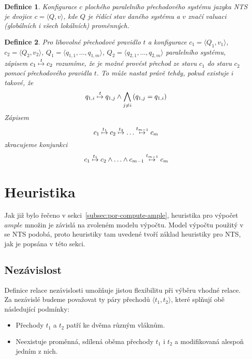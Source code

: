 \documentclass[12pt]{fithesis2}
\newtheorem{definition}{Definice}
\newcommand{\tuple}[1]{\langle #1 \rangle}
\begin{document}
\begin{definition}
\textit{Konfigurace} $c$ plochého paralelního přechodového systému jazyka NTS je dvojice $c = \tuple{Q, v}$, kde $Q$ je řídící stav daného systému a $v$ značí valuaci (globálních i všech lokálních) proměnných.
\end{definition}

\begin{definition}
Pro libovolné přechodové pravidlo $t$ a konfigurace $c_1 = \tuple{Q_1, v_1}$, $c_2=\tuple{Q_2, v_2}$, $Q_1 = \tuple{q_{1,1}, \ldots, q_{1, m}}$, $Q_2 = \tuple{q_{2,1}, \ldots, q_{2, m}}$ paralelního systému, zápisem $c_1 \overset{t}{\mapsto} c_2$ rozumíme, že je možné provést přechod ze stavu $c_1$ do stavu $c_2$ pomocí přechodového pravidla $t$. To může nastat právě tehdy, pokud existuje $i$ takové, že
\begin{equation}
q_{1,i} \overset{t}{\mapsto} q_{1,j} \land \bigwedge_{j \neq i}\left({q_{1,j} = q_{1,i}}\right)
\end{equation}
Zápisem
\begin{equation*}
c_1 \overset{t_1}{\mapsto} c_2 \overset{t_2}{\mapsto} \ldots \overset{t_{m-1}}{\mapsto} c_m
\end{equation*}
zkracujeme konjunkci
\begin{equation*}
c_1 \overset{t_1}{\mapsto} c_2 \land \ldots \land c_{m-1} \overset{t_{m-1}}{\mapsto} c_m
\end{equation*}
\end{definition}


\section{Heuristika}
Jak již bylo řečeno v sekci~\ref{subsec:por-compute-ample}, heuristika pro výpočet $\mathit{ample}$ množin je závislá na zvoleném modelu výpočtu. Model výpočtu použitý v \cite{CLARKE} se NTS podobá, proto heuristiky tam uvedené tvoří základ heuristiky pro NTS, jak je popsána v této sekci.

\subsection{Nezávislost}
Definice relace nezávislosti umožňuje jistou flexibilitu při výběru vhodné relace. Za nezávislé budeme považovat ty páry přechodů $\tuple{t_1, t_2}$, které splňují obě následující podmínky:
\begin{itemize}
\item Přechody $t_1$ a $t_2$ patří ke dvěma různým vláknům.
\item Neexistuje proměnná, sdílená oběma přechody $t_1$ i $t_2$ a modifikovaná alespoň jedním z nich.
\end{itemize}
\end{document}
